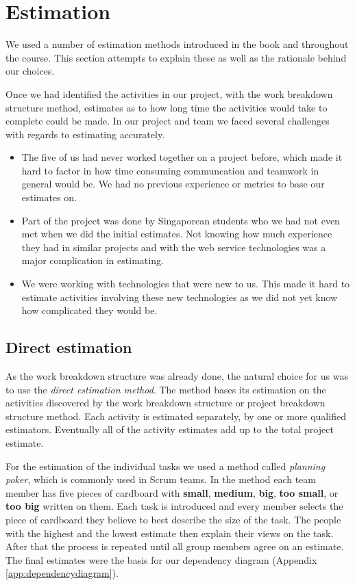 \section{Estimation}
\label{sec:EmpiriEstimation}

We used a number of estimation methods introduced in the book \cite[ch.~9]{caye} and throughout the
course. This section attempts to explain these as well as the rationale behind our choices.

Once we had identified the activities in our project, with the work breakdown structure method,
estimates as to how long time the activities would take to complete could be made. In our project
and team we faced several challenges with regards to estimating accurately.

\begin{itemize}
\item The five of us had never worked together on a project before, which made it hard to factor
    in how time consuming communcation and teamwork in general would be. We had no previous experience
    or metrics to base our estimates on.
    
\item Part of the project was done by Singaporean students who we had not even met when we did the
    initial estimates. Not knowing how much experience they had in similar projects and with the web
    service technologies was a major complication in estimating.
    
\item We were working with technologies that were new to us. This made it hard to estimate activities
    involving these new technologies as we did not yet know how complicated they would be.
\end{itemize}

\subsection{Direct estimation}

As the work breakdown structure was already done, the natural choice for us was to use the \emph{direct
estimation method}\cite{caye}. The method bases its estimation on the activities discovered by the work
breakdown structure or project breakdown structure method. Each activity is  estimated separately, by
one or more qualified estimators. Eventually all of the activity estimates add up to the total project
estimate. 

For the estimation of the individual tasks we used a method called \emph{planning poker}, which is commonly
used in Scrum teams. In the method each team member has five pieces of cardboard with \textbf{small},
\textbf{medium}, \textbf{big}, \textbf{too small}, or \textbf{too big} written on them. Each task is
introduced and every member selects the piece of cardboard they believe to best describe the size of the task.
The people with the highest and the lowest estimate then explain their views on the task. After that the
process is repeated until all group members agree on an estimate. The final estimates were the basis for our
dependency diagram (Appendix \ref{app:dependencydiagram}).

